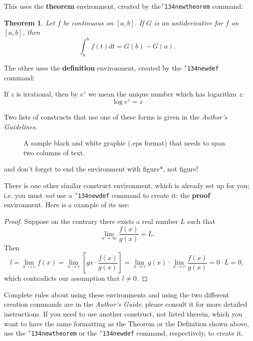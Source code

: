 \documentclass{acm_proc_article-sp}
\begin{document}
This uses the \textbf{theorem} environment, created by
the\linebreak\texttt{{\char'134}newtheorem} command:
\newtheorem{theorem}{Theorem}
\begin{theorem}
Let $f$ be continuous on $[a,b]$.  If $G$ is
an antiderivative for $f$ on $[a,b]$, then
\begin{displaymath}\int^b_af(t)dt = G(b) - G(a).\end{displaymath}
\end{theorem}

The other uses the \textbf{definition} environment, created
by the \texttt{{\char'134}newdef} command:
\begin{definition}
If $z$ is irrational, then by $e^z$ we mean the
unique number which has
logarithm $z$: \begin{displaymath}{\log e^z = z}\end{displaymath}
\end{definition}

Two lists of constructs that use one of these
forms is given in the
\textit{Author's  Guidelines}.

\begin{figure*}
\centering
\caption{A sample black and white graphic (.eps format)
that needs to span two columns of text.}
\end{figure*}
and don't forget to end the environment with
{figure*}, not {figure}!
 
There is one other similar construct environment, which is
already set up
for you; i.e. you must \textit{not} use
a \texttt{{\char'134}newdef} command to
create it: the \textbf{proof} environment.  Here
is a example of its use:
\begin{proof}
Suppose on the contrary there exists a real number $L$ such that
\begin{displaymath}
\lim_{x\rightarrow\infty} \frac{f(x)}{g(x)} = L.
\end{displaymath}
Then
\begin{displaymath}
l=\lim_{x\rightarrow c} f(x)
= \lim_{x\rightarrow c}
\left[ g{x} \cdot \frac{f(x)}{g(x)} \right ]
= \lim_{x\rightarrow c} g(x) \cdot \lim_{x\rightarrow c}
\frac{f(x)}{g(x)} = 0\cdot L = 0,
\end{displaymath}
which contradicts our assumption that $l\neq 0$.
\end{proof}

Complete rules about using these environments and using the
two different creation commands are in the
\textit{Author's Guide}; please consult it for more
detailed instructions.  If you need to use another construct,
not listed therein, which you want to have the same
formatting as the Theorem
or the Definition\cite{salas:calculus} shown above,
use the \texttt{{\char'134}newtheorem} or the
\texttt{{\char'134}newdef} command,
respectively, to create it.
\end{document}
